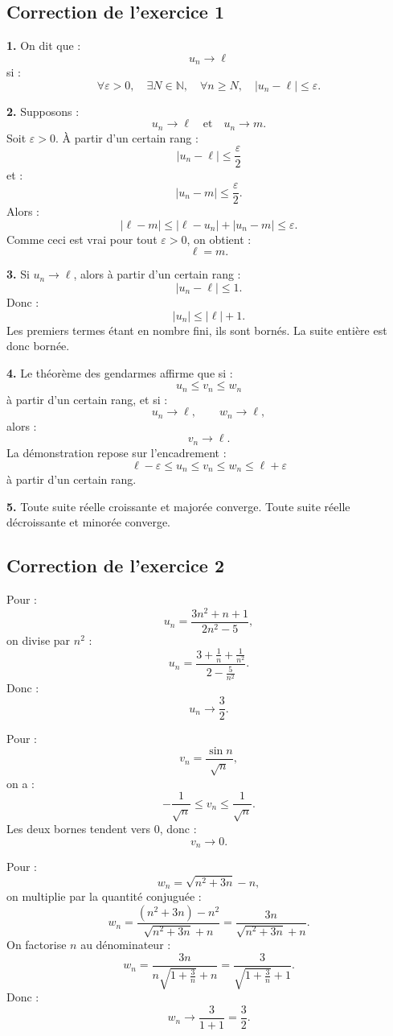 \documentclass[11pt,a4paper]{article}
\newcommand{\N}{\mathbb N}
\newcommand{\abs}[1]{\left|#1\right|}
\begin{document}
\subsection*{Correction de l'exercice 1}

\textbf{1.}
On dit que :
\[
u_n\to\ell
\]
si :
\[
\forall \varepsilon>0,\quad \exists N\in\N,\quad \forall n\geq N,\quad \abs{u_n-\ell}\leq\varepsilon.
\]

\textbf{2.}
Supposons :
\[
u_n\to\ell
\quad\text{et}\quad
u_n\to m.
\]
Soit \(\varepsilon>0\). À partir d'un certain rang :
\[
\abs{u_n-\ell}\leq\frac\varepsilon2
\]
et :
\[
\abs{u_n-m}\leq\frac\varepsilon2.
\]
Alors :
\[
\abs{\ell-m}
\leq
\abs{\ell-u_n}+\abs{u_n-m}
\leq
\varepsilon.
\]
Comme ceci est vrai pour tout \(\varepsilon>0\), on obtient :
\[
\ell=m.
\]

\textbf{3.}
Si \(u_n\to\ell\), alors à partir d'un certain rang :
\[
\abs{u_n-\ell}\leq1.
\]
Donc :
\[
\abs{u_n}\leq\abs{\ell}+1.
\]
Les premiers termes étant en nombre fini, ils sont bornés. La suite entière est donc bornée.

\textbf{4.}
Le théorème des gendarmes affirme que si :
\[
u_n\leq v_n\leq w_n
\]
à partir d'un certain rang, et si :
\[
u_n\to\ell,
\qquad
w_n\to\ell,
\]
alors :
\[
v_n\to\ell.
\]
La démonstration repose sur l'encadrement :
\[
\ell-\varepsilon\leq u_n\leq v_n\leq w_n\leq\ell+\varepsilon
\]
à partir d'un certain rang.

\textbf{5.}
Toute suite réelle croissante et majorée converge. Toute suite réelle décroissante et minorée converge.

\subsection*{Correction de l'exercice 2}

Pour :
\[
u_n=\frac{3n^2+n+1}{2n^2-5},
\]
on divise par \(n^2\) :
\[
u_n=\frac{3+\frac1n+\frac1{n^2}}{2-\frac5{n^2}}.
\]
Donc :
\[
u_n\to\frac32.
\]

Pour :
\[
v_n=\frac{\sin n}{\sqrt n},
\]
on a :
\[
-\frac1{\sqrt n}\leq v_n\leq\frac1{\sqrt n}.
\]
Les deux bornes tendent vers \(0\), donc :
\[
v_n\to0.
\]

Pour :
\[
w_n=\sqrt{n^2+3n}-n,
\]
on multiplie par la quantité conjuguée :
\[
w_n
=
\frac{(n^2+3n)-n^2}{\sqrt{n^2+3n}+n}
=
\frac{3n}{\sqrt{n^2+3n}+n}.
\]
On factorise \(n\) au dénominateur :
\[
w_n=
\frac{3n}{n\sqrt{1+\frac3n}+n}
=
\frac3{\sqrt{1+\frac3n}+1}.
\]
Donc :
\[
w_n\to\frac3{1+1}=\frac32.
\]
\end{document}
